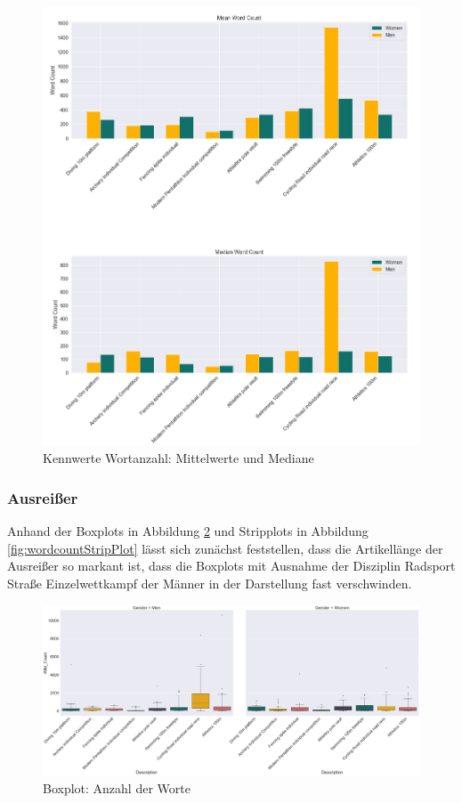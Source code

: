 \documentclass[11pt]{article}
\begin{document}
\begin{figure}
\includegraphics[width=1\textwidth]{figures/wordcount_mean_median.png}
\caption[Kennwerte Wortanzahl: Mittelwerte und Mediane]{Kennwerte Wortanzahl: Mittelwerte und Mediane}
\label{fig:wordcountMeanMedian}
\end{figure}

\subsubsection{Ausreißer}

Anhand der Boxplots in Abbildung \ref{fig:wordcountBoxPlot} und Stripplots in Abbildung \ref{fig:wordcountStripPlot} lässt sich zunächst feststellen, dass die Artikellänge der Ausreißer so markant ist, dass die Boxplots mit Ausnahme der Disziplin Radsport Straße Einzelwettkampf der Männer in der Darstellung fast verschwinden.

\begin{figure}
\includegraphics[width=1\textwidth]{figures/wordcount_boxplot.png}
\caption[Boxplot: Anzahl der Worte]{Boxplot: Anzahl der Worte}
\label{fig:wordcountBoxPlot}
\end{figure}
\end{document}
